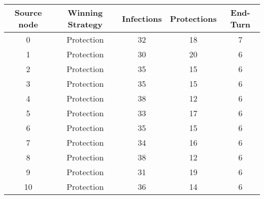 \documentclass[results.tex]{subfiles}
\begin{document}
    \begin{center}
        \begin{tabular}{| c || c | c | c | c |}
            \hline
            {\bfseries Source node} & {\bfseries Winning Strategy} & {\bfseries Infections} & {\bfseries Protections}
            & {\bfseries End-Turn}
            \\  %
            \hline\hline
            0                       & Protection                   & 32                     & 18                      & 7                    \\
            \hline
            1                       & Protection                   & 30                     & 20                      & 6                    \\
            \hline
            2                       & Protection                   & 35                     & 15                      & 6                    \\
            \hline
            3                       & Protection                   & 35                     & 15                      & 6                    \\
            \hline
            4                       & Protection                   & 38                     & 12                      & 6                    \\
            \hline
            5                       & Protection                   & 33                     & 17                      & 6                    \\
            \hline
            6                       & Protection                   & 35                     & 15                      & 6                    \\
            \hline
            7                       & Protection                   & 34                     & 16                      & 6                    \\
            \hline
            8                       & Protection                   & 38                     & 12                      & 6                    \\
            \hline
            9                       & Protection                   & 31                     & 19                      & 6                    \\
            \hline
            10                      & Protection                   & 36                     & 14                      & 6                    \\

\end{tabular}
\end{center}
\end{document}
